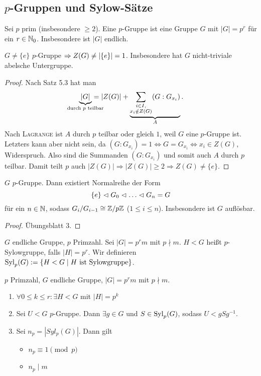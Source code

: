 \documentclass[12pt,a4paper]{scrartcl}
\begin{document}
\subsection{$p$-Gruppen und Sylow-Sätze}
\begin{defi}
	Sei $p$ prim (insbesondere $\geq 2$). Eine $p$-Gruppe ist eine Gruppe $G$ mit $|G| = p^r$ für ein $r\in\IN_0$. Insbesondere ist $|G|$ endlich.
\end{defi}
\begin{satz}[Satz 6.1]
	$G\neq\{e\}$ $p$-Gruppe $\Rightarrow Z(G)\neq \abs*{\{e\}} = 1$. Insbesondere hat $G$ nicht-triviale abelsche Untergruppe.
\end{satz}
\begin{proof}
	Nach Satz 5.3 hat man \[ \underbrace{|G|}_{\mathclap{\text{durch $p$ teilbar}}}  = |Z(G)| + \underbrace{\sum_{\substack{i\in I,\\x_i\notin Z(G)}}(G: G_{x_i})}_{A}.\] Nach \textsc{Lagrange} ist $A$ durch $p$ teilbar oder gleich $1$, weil $G$ eine $p$-Gruppe ist. Letzters kann aber nicht sein, da $(G:G_{x_i}) = 1 \Leftrightarrow G = G_{x_i}\Leftrightarrow x_i\in Z(G)$, Widerspruch. Also sind die Summanden $(G:G_{x_i})$ und somit auch $A$ durch $p$ teilbar. Damit teilt $p$ auch $|Z(G)|\Rightarrow |Z(G)|\geq 2\Rightarrow Z(G)\neq \{e\}$.
\end{proof}

\begin{satz}[Satz 6.2]
	$G$ $p$-Gruppe. Dann existiert Normalreihe der Form
	$$ \{e\}\nt G_0\nt\dots\nt G_n = G$$ für ein $n\in\IN$, sodass $G_i/G_{i-1}\cong \IZ/p\IZ$ ($1\le i\le n$).
	Insbesondere ist $G$ auflösbar.
\end{satz}
\begin{proof}
	Übungsblatt 3.
\end{proof}

\begin{defi}
	$G$ endliche Gruppe, $p$ Primzahl. Sei $|G| = p^rm$ mit $p\nmid m$. $H<G$ heißt $p$-Sylowgruppe, falls $|H| = p^r$. Wir definieren  $\Syl_p(G):=\{H<G\mid H\text{ ist Sylowgruppe}\}$.
\end{defi}

\begin{satz}
	$p$ Primzahl, $G$ endliche Gruppe, $|G| = p^rm$ mit $p\nmid m$.\begin{enumerate}
		\item $\forall 0\le k\le r :\exists H<G$ mit $|H| = p^k$
		\item Sei $U<G$ $p$-Gruppe. Dann $\exists g\in G$ und $S\in \Syl_p(G)$, sodass $U<gSg^{-1}$.
		\item Sei $n_p = |Syl_p(G)|$. Dann gilt \begin{itemize}
			\item $n_p\equiv 1\pmod p$
			\item $n_p\mid m$
		\end{itemize}
	\end{enumerate}
\end{satz}
\end{document}
